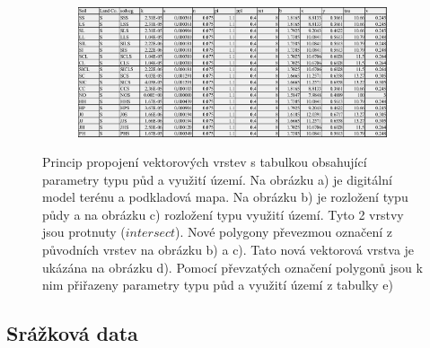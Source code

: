 \begin{figure}[t!]
\begin{subfigure}[b]{0.4\linewidth}
    \caption{\label{fig:prunik}}
  \end{subfigure}\\
  \begin{subfigure}[b]{0.8\linewidth}
    \centering\includegraphics[width=1\linewidth]{./img/soilvegtablo.png}
    \caption{\label{fig:soilvegtablo}}
  \end{subfigure}%
  \caption{Princip propojení vektorových vrstev s tabulkou obsahující parametry typu půd a využití území. Na obrázku a) je digitální model terénu a podkladová mapa. Na obrázku b) je rozložení typu půdy a na obrázku c) rozložení typu využití území. Tyto 2 vrstvy jsou protnuty ($intersect$). Nové polygony převezmou označení z původních vrstev na obrázku b) a c). Tato nová vektorová vrstva je ukázána na obrázku d). Pomocí převzatých označení polygonů jsou k nim přiřazeny parametry typu půd a využití území z tabulky e)}
  \label{fig:soillu}
\end{figure}


























\subsection{Srážková data} \label{sec:vstupsrazka}

